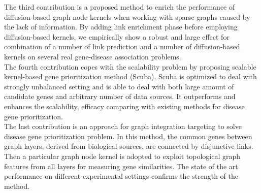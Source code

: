 The third contribution is a proposed method to enrich the performance of diffusion-based graph node kernels when working with sparse graphs caused by the lack of information. By adding link enrichment phase before employing diffusion-based kernels, we empirically show a robust and large effect for combination of a number of link prediction and a number of diffusion-based kernels on several real gene-disease association problems.\\

The fourth contribution copes with the scalability problem by proposing scalable kernel-based gene prioritization method (Scuba). Scuba is optimized to deal with strongly unbalanced setting and is able to deal with both large amount of candidate genes and arbitrary number of data sources. It outperforms and enhances the scalability, efficacy comparing with existing methods for disease gene prioritization.\\

The last contribution is an approach for graph integration targeting to solve disease gene prioritization problem. In this method, the common genes between graph layers, derived from biological sources, are connected by disjunctive links. Then a particular graph node kernel is adopted to exploit topological graph features from all layers for measuring gene similarities. The state of the art performance on different experimental settings confirms the strength of the method. 
